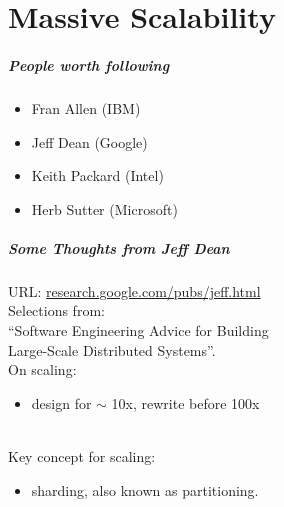 \documentclass[aspectratio=43]{beamer}
\newenvironment{changemargin}[1]{%
  \begin{list}{}{%
    \setlength{\topsep}{0pt}%
    \setlength{\leftmargin}{#1}%
    \setlength{\rightmargin}{1em}
    \setlength{\listparindent}{\parindent}%
    \setlength{\itemindent}{\parindent}%
    \setlength{\parsep}{\parskip}%
  }%
  \item[]}{\end{list}}
\begin{document}
\part{Massive Scalability}
\frame{\partpage}

\begin{frame}
  \frametitle{People worth following}

  \begin{changemargin}{2cm}
\Large
  \begin{itemize}
    \item Fran Allen (IBM)
    \item Jeff Dean (Google)
    \item Keith Packard (Intel)
    \item Herb Sutter (Microsoft)
  \end{itemize}
  \end{changemargin}
\end{frame}

\begin{frame}
  \frametitle{Some Thoughts from Jeff Dean}

  \begin{changemargin}{2cm}
    URL: \url{research.google.com/pubs/jeff.html}\\[1em]

    Selections from:\\
    ``Software Engineering Advice for Building\\
\qquad  Large-Scale Distributed Systems''.\\[1em]

    On scaling:
\begin{itemize}
  \item design for $\sim$ 10x, rewrite before 100x
\end{itemize}
~\\

    Key concept for scaling:
\begin{itemize}
  \item sharding, also known as partitioning.
\end{itemize}

  \end{changemargin}
\end{frame}
\end{document}
